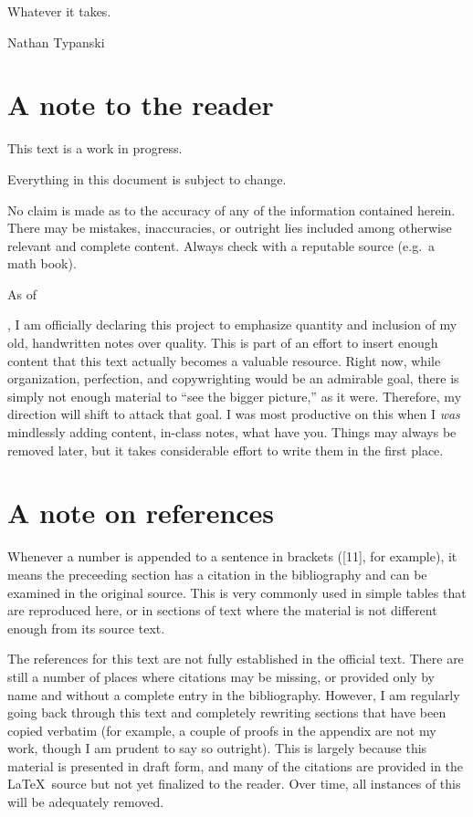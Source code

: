 Whatever it takes.

\hfill{Nathan Typanski}

\hfill \date{April 9, 2012}
\newpage
\section*{A note to the reader}
This text is a work in progress.

Everything in this document is subject to change.

No claim is made as to the accuracy of any of the information contained herein. There may be mistakes, inaccuracies, or outright lies included among otherwise relevant and complete content. Always check with a reputable source (e.g.\ a math book).

As of \date{July 14, 2013}, I am officially declaring this project to emphasize quantity and inclusion of my old, handwritten notes over quality.
This is part of an effort to insert enough content that this text actually becomes a valuable resource.
Right now, while organization, perfection, and copywrighting would be an admirable goal, there is simply not enough material to ``see the bigger picture,'' as it were.
Therefore, my direction will shift to attack that goal.
I was most productive on this when I \emph{was} mindlessly adding content, in-class notes, what have you.
Things may always be removed later, but it takes considerable effort to write them in the first place.
\newpage
\section*{A note on references}
Whenever a number is appended to a sentence in brackets ([11], for example), it means the preceeding section has a citation in the bibliography and can be examined in the original source.
This is very commonly used in simple tables that are reproduced here, or in sections of text where the material is not different enough from its source text.

The references for this text are not fully established in the official text.
There are still a number of places where citations may be missing, or provided only by name and without a complete entry in the bibliography.
However, I am regularly going back through this text and completely rewriting sections that have been copied verbatim (for example, a couple of proofs in the appendix are not my work, though I am prudent to say so outright).
This is largely because this material is presented in draft form, and many of the citations are provided in the \LaTeX\ source but not yet finalized to the reader.
Over time, all instances of this will be adequately removed.
